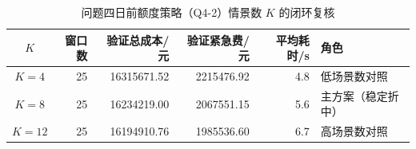 \begin{table}[htbp]
\centering
\caption{问题四日前额度策略（Q4-2）情景数 $K$ 的闭环复核}\label{tab:q4-parameter}
\small\setlength{\tabcolsep}{3pt}
\begin{tabular}{@{}crrrrl@{}}
\toprule
$K$ & 窗口数 & 验证总成本/元 & 验证紧急费/元 & 平均耗时/s & 角色 \\
\midrule
$K=4$ & 25 & 16315671.52 & 2215476.92 & 4.8 & 低场景数对照 \\
$K=8$ & 25 & 16234219.00 & 2067551.15 & 5.6 & 主方案（稳定折中） \\
$K=12$ & 25 & 16194910.76 & 1985536.60 & 6.7 & 高场景数对照 \\\bottomrule
\end{tabular}
\end{table}
